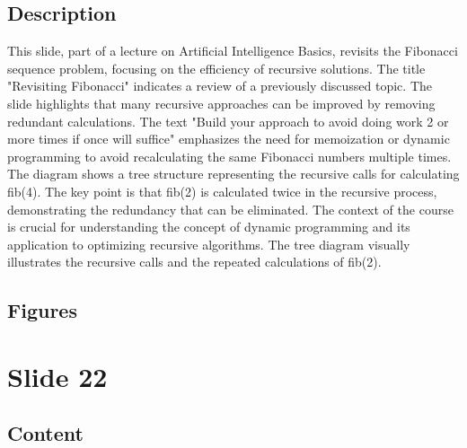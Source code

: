 \documentclass{article}%
\begin{document}
\subsection{Description}%
This slide, part of a lecture on Artificial Intelligence Basics, revisits the Fibonacci sequence problem, focusing on the efficiency of recursive solutions.  The title "Revisiting Fibonacci" indicates a review of a previously discussed topic.  The slide highlights that many recursive approaches can be improved by removing redundant calculations.  The text "Build your approach to avoid doing work 2 or more times if once will suffice" emphasizes the need for memoization or dynamic programming to avoid recalculating the same Fibonacci numbers multiple times.  The diagram shows a tree structure representing the recursive calls for calculating fib(4).  The key point is that fib(2) is calculated twice in the recursive process, demonstrating the redundancy that can be eliminated.  The context of the course is crucial for understanding the concept of dynamic programming and its application to optimizing recursive algorithms. The tree diagram visually illustrates the recursive calls and the repeated calculations of fib(2).%
\subsection{Figures}%
\begin{figure}[H]%
\centering%
\end{figure}

%
\newpage%
\section{Slide 22}%
\label{sec:Slide22}%
\subsection{Content}%
\end{document}
